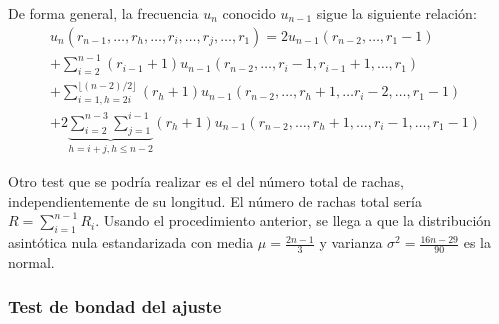 	De forma general, la frecuencia $u_n$ conocido $u_{n-1}$ sigue la siguiente relación:
\begin{align}
	& u_n (r_{n-1}, \dots, r_h, \dots, r_i, \dots, r_j, \dots, r_1)= 
		2 u_{n-1}(r_{n-2}, \dots, r_1-1) \\
	&+ \sum\limits_{i=2}^{n-1} 
		(r_{i-1} + 1)
		u_{n-1}(r_{n-2},\dots, r_i-1, r_{i-1}+1,\dots, r_1)\\
	&+ \sum\limits_{i=1, h=2i}^{\lfloor (n-2)/2 \rfloor} 
		(r_{h} + 1)
		u_{n-1}(r_{n-2},\dots, r_h+1,\dots r_i-2,\dots, r_1-1)\\
	&+ 2 \underbrace{\sum\limits_{i=2}^{n-3} \sum\limits_{j=1}^{i-1}}_{h=i+j, h \leq n-2}
		(r_{h} + 1)
		u_{n-1}(r_{n-2},\dots, r_h+1,\dots, r_i-1,\dots, r_1-1)			
\end{align}
	
	Otro test que se podría realizar es el del número total de rachas, independientemente de su longitud. El número de rachas total sería $R = \sum\limits_{i=1}^{n-1} R_i$. Usando el procedimiento anterior, se llega a que la distribución asintótica nula estandarizada con media $\mu = \frac{2n-1}{3}$ y varianza $\sigma^2=\frac{16n-29}{90}$ es la normal.
	
\subsubsection{Test de bondad del ajuste}